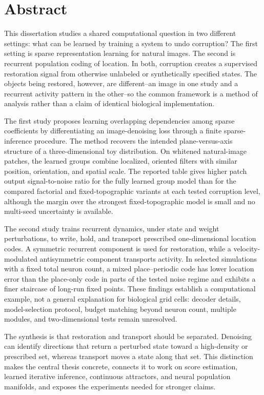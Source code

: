 \chapter*{Abstract}

This dissertation studies a shared computational question in two different settings: what can be learned by training a system to undo corruption? The first setting is sparse representation learning for natural images. The second is recurrent population coding of location. In both, corruption creates a supervised restoration signal from otherwise unlabeled or synthetically specified states. The objects being restored, however, are different--an image in one study and a recurrent activity pattern in the other--so the common framework is a method of analysis rather than a claim of identical biological implementation.

The first study proposes learning overlapping dependencies among sparse coefficients by differentiating an image-denoising loss through a finite sparse-inference procedure. The method recovers the intended plane-versus-axis structure of a three-dimensional toy distribution. On whitened natural-image patches, the learned groups combine localized, oriented filters with similar position, orientation, and spatial scale. The reported table gives higher patch output signal-to-noise ratio for the fully learned group model than for the compared factorial and fixed-topographic variants at each tested corruption level, although the margin over the strongest fixed-topographic model is small and no multi-seed uncertainty is available.

The second study trains recurrent dynamics, under state and weight perturbations, to write, hold, and transport prescribed one-dimensional location codes. A symmetric recurrent component is used for restoration, while a velocity-modulated antisymmetric component transports activity. In selected simulations with a fixed total neuron count, a mixed place--periodic code has lower location error than the place-only code in parts of the tested noise regime and exhibits a finer staircase of long-run fixed points. These findings establish a computational example, not a general explanation for biological grid cells: decoder details, model-selection protocol, budget matching beyond neuron count, multiple modules, and two-dimensional tests remain unresolved.

The synthesis is that restoration and transport should be separated. Denoising can identify directions that return a perturbed state toward a high-density or prescribed set, whereas transport moves a state along that set. This distinction makes the central thesis concrete, connects it to work on score estimation, learned iterative inference, continuous attractors, and neural population manifolds, and exposes the experiments needed for stronger claims.
